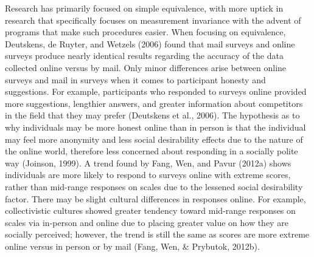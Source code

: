 \documentclass[english,man]{apa6}
\theoremstyle{definition}
\theoremstyle{definition}
\theoremstyle{definition}
\theoremstyle{remark}
\begin{document}
Research has primarily focused on simple equivalence, with more uptick
in research that specifically focuses on measurement invariance with the
advent of programs that make such procedures easier. When focusing on
equivalence, Deutskens, de Ruyter, and Wetzels (2006) found that mail
surveys and online surveys produce nearly identical results regarding
the accuracy of the data collected online versus by mail. Only minor
differences arise between online surveys and mail in surveys when it
comes to participant honesty and suggestions. For example, participants
who responded to surveys online provided more suggestions, lengthier
answers, and greater information about competitors in the field that
they may prefer (Deutskens et al., 2006). The hypothesis as to why
individuals may be more honest online than in person is that the
individual may feel more anonymity and less social desirability effects
due to the nature of the online world, therefore less concerned about
responding in a socially polite way (Joinson, 1999). A trend found by
Fang, Wen, and Pavur (2012a) shows individuals are more likely to
respond to surveys online with extreme scores, rather than mid-range
responses on scales due to the lessened social desirability factor.
There may be slight cultural differences in responses online. For
example, collectivistic cultures showed greater tendency toward
mid-range responses on scales via in-person and online due to placing
greater value on how they are socially perceived; however, the trend is
still the same as scores are more extreme online versus in person or by
mail (Fang, Wen, \& Prybutok, 2012b).
\end{document}
